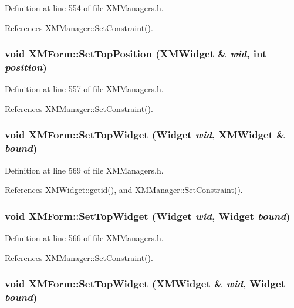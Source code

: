 Definition at line 554 of file XMManagers.h.

References XMManager::Set\-Constraint().
\subsubsection{\setlength{\rightskip}{0pt plus 5cm}void XMForm::Set\-Top\-Position ({\bf XMWidget} \& {\em wid}, int {\em position})\hspace{0.3cm}{\tt  [inline]}}\label{classXMForm_a30}




Definition at line 557 of file XMManagers.h.

References XMManager::Set\-Constraint().
\subsubsection{\setlength{\rightskip}{0pt plus 5cm}void XMForm::Set\-Top\-Widget (Widget {\em wid}, {\bf XMWidget} \& {\em bound})\hspace{0.3cm}{\tt  [inline]}}\label{classXMForm_a34}




Definition at line 569 of file XMManagers.h.

References XMWidget::getid(), and XMManager::Set\-Constraint().
\subsubsection{\setlength{\rightskip}{0pt plus 5cm}void XMForm::Set\-Top\-Widget (Widget {\em wid}, Widget {\em bound})\hspace{0.3cm}{\tt  [inline]}}\label{classXMForm_a33}




Definition at line 566 of file XMManagers.h.

References XMManager::Set\-Constraint().
\subsubsection{\setlength{\rightskip}{0pt plus 5cm}void XMForm::Set\-Top\-Widget ({\bf XMWidget} \& {\em wid}, Widget {\em bound})\hspace{0.3cm}{\tt  [inline]}}\label{classXMForm_a32}




